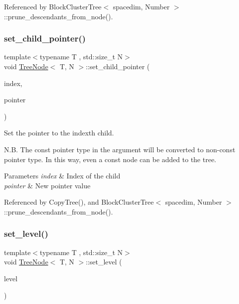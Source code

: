 Referenced by Block\+Cluster\+Tree$<$ spacedim, Number $>$\+::prune\+\_\+descendants\+\_\+from\+\_\+node().

\mbox{\label{classTreeNode_a3d2f374424a723cb72409857ee5237bc}} 
\subsubsection{\texorpdfstring{set\+\_\+child\+\_\+pointer()}{set\_child\_pointer()}}
{\footnotesize\ttfamily template$<$typename T , std\+::size\+\_\+t N$>$ \\
void \hyperlink{classTreeNode}{Tree\+Node}$<$ T, N $>$\+::set\+\_\+child\+\_\+pointer (\begin{DoxyParamCaption}\item[{std\+::size\+\_\+t}]{index,  }\item[{const \hyperlink{classTreeNode}{Tree\+Node}$<$ T, N $>$ $\ast$}]{pointer }\end{DoxyParamCaption})}

Set the pointer to the {\ttfamily index\textquotesingle{}th} child.

N.\+B. The const pointer type in the argument will be converted to non-\/const pointer type. In this way, even a const node can be added to the tree. 
\begin{DoxyParams}{Parameters}
{\em index} & Index of the child \\
\hline
{\em pointer} & New pointer value \\
\hline
\end{DoxyParams}


Referenced by Copy\+Tree(), and Block\+Cluster\+Tree$<$ spacedim, Number $>$\+::prune\+\_\+descendants\+\_\+from\+\_\+node().

\mbox{\label{classTreeNode_a67e5762f796247c38f4a2560c1250b11}} 
\subsubsection{\texorpdfstring{set\+\_\+level()}{set\_level()}}
{\footnotesize\ttfamily template$<$typename T , std\+::size\+\_\+t N$>$ \\
void \hyperlink{classTreeNode}{Tree\+Node}$<$ T, N $>$\+::set\+\_\+level (\begin{DoxyParamCaption}\item[{const unsigned int}]{level }\end{DoxyParamCaption})}

